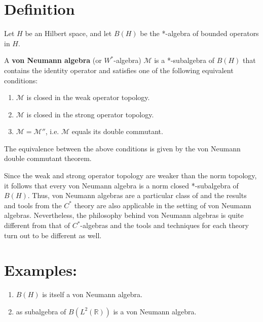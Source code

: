 \documentclass[12pt]{article}
\begin{document}

\section*{Definition}

Let $H$ be an Hilbert space, and let $B(H)$ be the *-algebra of bounded operators in $H$.

A {\bf von Neumann algebra} (or $W^*$-algebra) $\mathcal M$ is a *-subalgebra of $B(H)$ 
that contains the identity operator and satisfies one of the following equivalent conditions:
\begin{enumerate}
\item $\mathcal M$ is closed in the weak operator topology.
\item $\mathcal M$ is closed in the strong operator topology.
\item $\mathcal M = \mathcal M''$, i.e. $\mathcal M$ equals its double commutant.
\end{enumerate}

The equivalence between the above conditions is given by the von Neumann double commutant theorem.

Since the weak and strong operator topology are weaker than the norm topology, it follows that every von Neumann algebra is a norm closed *-subalgebra of $B(H)$. Thus, von Neumann algebras are a particular class of  and the results and tools from the $C^*$ theory are also applicable in the setting of von Neumann algebras. Nevertheless, the philosophy behind von Neumann algebras is quite different from that of $C^*$-algebras and the tools and techniques for each theory turn out to be different as well.

\section*{Examples:}
\begin{enumerate}
\item $B(H)$ is itself a von Neumann algebra.
\item {} as subalgebra of $B(L^2(\mathbb{R}))$ is a von Neumann algebra.
\end{enumerate}


\end{document}
